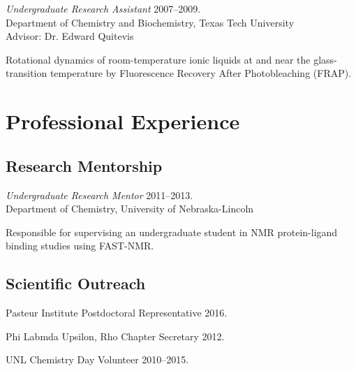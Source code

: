 \documentclass[letterpaper]{article}
\renewenvironment{itemize}{
  \begin{list}{}{
    \setlength{\leftmargin}{1.5em}
  }
}{
  \end{list}
}
\begin{document}
\begin{itemize}
\item{
  {\it Undergraduate Research Assistant}
  \hfill 2007--2009. \\
  Department of Chemistry and Biochemistry, Texas Tech University \\
  {\setlength{\topmargin}{0pt} Advisor: Dr. Edward Quitevis}
  \begin{enumerate*}
    \item Rotational dynamics of room-temperature ionic liquids at and near
      the glass-transition temperature by Fluorescence Recovery After
      Photobleaching (FRAP).
  \end{enumerate*}
}
\end{itemize}


\section*{Professional Experience}

\subsection*{Research Mentorship}

\begin{itemize}
\item{
  {\it Undergraduate Research Mentor}
  \hfill 2011--2013. \\
  Department of Chemistry, University of Nebraska-Lincoln
  \begin{enumerate*}
    \item Responsible for supervising an undergraduate student in NMR
      protein-ligand binding studies using FAST-NMR.
  \end{enumerate*}
}
\end{itemize}

\subsection*{Scientific Outreach}

\begin{itemize}
\item Pasteur Institute Postdoctoral Representative \hfill 2016.
\item Phi Labmda Upsilon, Rho Chapter Secretary \hfill 2012.
\item UNL Chemistry Day Volunteer \hfill 2010--2015.
\end{itemize}
\end{document}

